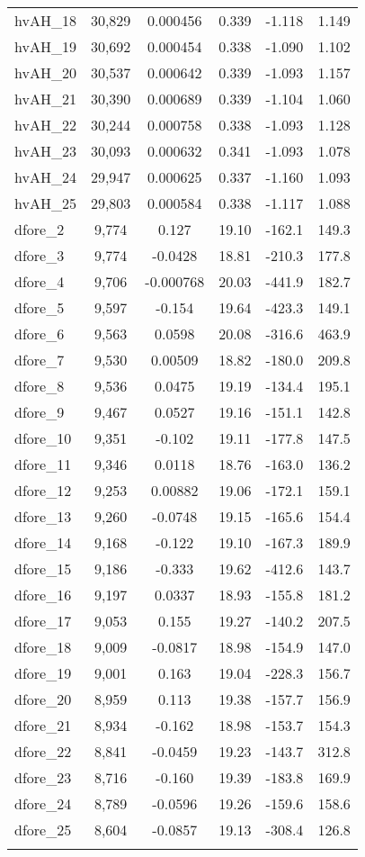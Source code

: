 \begin{tabular}{lccccc}
hvAH\_18 & 30,829 & 0.000456 & 0.339 & -1.118 & 1.149 \\
hvAH\_19 & 30,692 & 0.000454 & 0.338 & -1.090 & 1.102 \\
hvAH\_20 & 30,537 & 0.000642 & 0.339 & -1.093 & 1.157 \\
hvAH\_21 & 30,390 & 0.000689 & 0.339 & -1.104 & 1.060 \\
hvAH\_22 & 30,244 & 0.000758 & 0.338 & -1.093 & 1.128 \\
hvAH\_23 & 30,093 & 0.000632 & 0.341 & -1.093 & 1.078 \\
hvAH\_24 & 29,947 & 0.000625 & 0.337 & -1.160 & 1.093 \\
hvAH\_25 & 29,803 & 0.000584 & 0.338 & -1.117 & 1.088 \\
dfore\_2 & 9,774 & 0.127 & 19.10 & -162.1 & 149.3 \\
dfore\_3 & 9,774 & -0.0428 & 18.81 & -210.3 & 177.8 \\
dfore\_4 & 9,706 & -0.000768 & 20.03 & -441.9 & 182.7 \\
dfore\_5 & 9,597 & -0.154 & 19.64 & -423.3 & 149.1 \\
dfore\_6 & 9,563 & 0.0598 & 20.08 & -316.6 & 463.9 \\
dfore\_7 & 9,530 & 0.00509 & 18.82 & -180.0 & 209.8 \\
dfore\_8 & 9,536 & 0.0475 & 19.19 & -134.4 & 195.1 \\
dfore\_9 & 9,467 & 0.0527 & 19.16 & -151.1 & 142.8 \\
dfore\_10 & 9,351 & -0.102 & 19.11 & -177.8 & 147.5 \\
dfore\_11 & 9,346 & 0.0118 & 18.76 & -163.0 & 136.2 \\
dfore\_12 & 9,253 & 0.00882 & 19.06 & -172.1 & 159.1 \\
dfore\_13 & 9,260 & -0.0748 & 19.15 & -165.6 & 154.4 \\
dfore\_14 & 9,168 & -0.122 & 19.10 & -167.3 & 189.9 \\
dfore\_15 & 9,186 & -0.333 & 19.62 & -412.6 & 143.7 \\
dfore\_16 & 9,197 & 0.0337 & 18.93 & -155.8 & 181.2 \\
dfore\_17 & 9,053 & 0.155 & 19.27 & -140.2 & 207.5 \\
dfore\_18 & 9,009 & -0.0817 & 18.98 & -154.9 & 147.0 \\
dfore\_19 & 9,001 & 0.163 & 19.04 & -228.3 & 156.7 \\
dfore\_20 & 8,959 & 0.113 & 19.38 & -157.7 & 156.9 \\
dfore\_21 & 8,934 & -0.162 & 18.98 & -153.7 & 154.3 \\
dfore\_22 & 8,841 & -0.0459 & 19.23 & -143.7 & 312.8 \\
dfore\_23 & 8,716 & -0.160 & 19.39 & -183.8 & 169.9 \\
dfore\_24 & 8,789 & -0.0596 & 19.26 & -159.6 & 158.6 \\
dfore\_25 & 8,604 & -0.0857 & 19.13 & -308.4 & 126.8 \\
 &  &  &  &  &  \\ \hline
\end{tabular}
